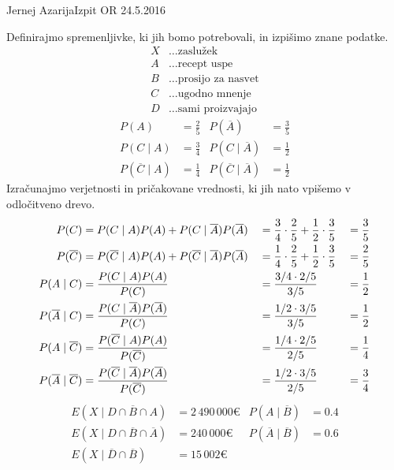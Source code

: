 \begin{naloga}{Jernej Azarija}{Izpit OR 24.5.2016}
\begin{odgovor}
Definirajmo spremenljivke, ki jih bomo potrebovali,
in izpišimo znane podatke.
\begin{align*}
X &\dots \text{zaslužek}\\
A &\dots \text{recept uspe}\\
B &\dots \text{prosijo za nasvet}\\
C &\dots \text{ugodno mnenje}\\
D &\dots \text{sami proizvajajo}
\end{align*}
\begin{align*}
P(A) &= \frac{2}{5} &
P(\overline{A}) &= \frac{3}{5} \\
P(C \mid A)& = \frac{3}{4} &
P(C \mid \overline{A}) &= \frac{1}{2} \\
P(\overline{C} \mid A) &= \frac{1}{4} &
P(\overline{C} \mid \overline{A}) &= \frac{1}{2}
\end{align*}
Izračunajmo verjetnosti in pričakovane vrednosti,
ki jih nato vpišemo v od\-lo\-čit\-ve\-no drevo.
\begin{alignat*}{3}
P(C) &= P(C \mid A) P(A) + P(C \mid \overline{A}) P(\overline{A})
&&= \frac{3}{4}\cdot \frac{2}{5} + \frac{1}{2}\cdot \frac{3}{5}
&&= \frac{3}{5} \\
P(\overline{C}) &= P(\overline{C} \mid A) P(A) + P(\overline{C} \mid \overline{A}) P(\overline{A})
&&= \frac{1}{4}\cdot \frac{2}{5} + \frac{1}{2}\cdot \frac{3}{5}
&&= \frac{2}{5} \\
P(A \mid C) &= \frac{P(C \mid A) P(A)}{P(C)}
&&= {3/4 \cdot 2/5 \over 3/5} &&= \frac{1}{2} \\
P(\overline{A} \mid C) &= \frac{P(C \mid \overline{A})P(\overline{A})}{P(C)}
&&= {1/2 \cdot 3/5 \over 3/5} &&= \frac{1}{2} \\
P(A \mid \overline{C}) &= \frac{P(\overline{C} \mid A) P(A)}{P(\overline{C})}
&&= {1/4 \cdot 2/5 \over 2/5} &&= \frac{1}{4} \\
P(\overline{A} \mid \overline{C}) &= \frac{P(\overline{C} \mid \overline{A})P(\overline{A})}{P(\overline{C})}
&&= {1/2 \cdot 3/5 \over 2/5} &&= \frac{3}{4}
\end{alignat*}
\odstraniprostor
\begin{align*}
E(X \mid D \cap \overline{B} \cap A) &= 2\,490\,000 € &
P(A \mid \overline{B}) &= 0.4 \\
E(X \mid D \cap \overline{B} \cap \overline{A}) &= 240\,000 € &
P(\overline{A} \mid \overline{B})& = 0.6 \\
E(X \mid \overline{D} \cap \overline{B}) &= 15\,002 € \\[1ex]

\end{align*}
\end{odgovor}
\end{naloga}
